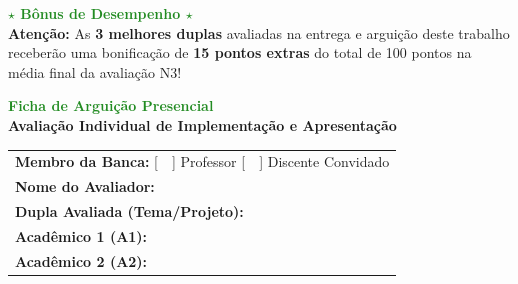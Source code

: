 \documentclass[12pt,a4paper]{article}
\begin{document}
\vspace{0.4cm}
\begin{center}
    \textcolor{forestgreen}{\textbf{\Large $\star$ Bônus de Desempenho $\star$}} \\[0.2cm]
    \textbf{Atenção:} As \textbf{3 melhores duplas} avaliadas na entrega e arguição deste trabalho receberão uma bonificação de \textbf{15 pontos extras } do total de 100 pontos na média final da avaliação N3!
\end{center}
\newpage
\thispagestyle{empty}

\begin{center}
    {\huge \textbf{\textcolor{forestgreen}{Ficha de Arguição Presencial}}} \\[0.3cm]
    {\large \textbf{Avaliação Individual de Implementação e Apresentação}} \\[0.8cm]
\end{center}

\begin{tcolorbox}[colback=white, colframe=forestgreen, title=\textbf{Identificação da Avaliação}, fonttitle=\bfseries]
    \renewcommand{\arraystretch}{1.5}
    \begin{tabular}{p{}}
         \textbf{Membro da Banca:} [~~] Professor \hspace{1cm} [~~] Discente Convidado \\
         \textbf{Nome do Avaliador:} \underline{\hspace{10cm}} \\
         \textbf{Dupla Avaliada (Tema/Projeto):} \underline{\hspace{8.5cm}} \\
         \textbf{Acadêmico 1 (A1):} \underline{\hspace{12cm}} \\
         \textbf{Acadêmico 2 (A2):} \underline{\hspace{12cm}} \\
    \end{tabular}
\end{tcolorbox}

\vspace{0.8cm}
\end{document}
